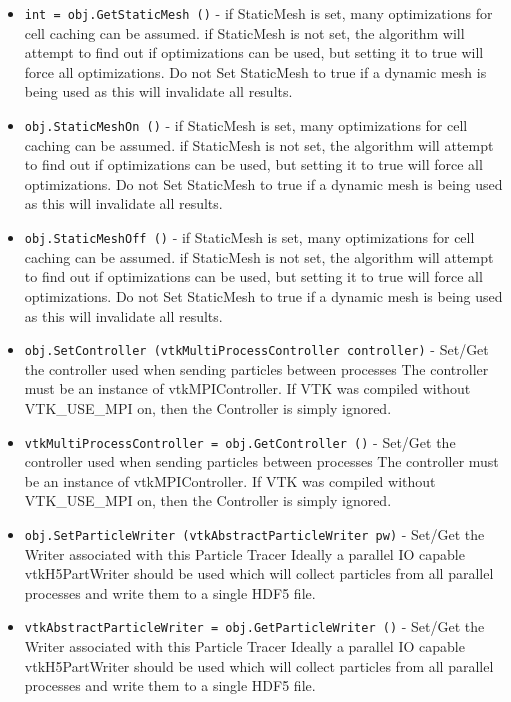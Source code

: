 \begin{itemize}
\item  \verb|int = obj.GetStaticMesh ()| -  if StaticMesh is set, many optimizations for cell caching
 can be assumed. if StaticMesh is not set, the algorithm
 will attempt to find out if optimizations can be used, but
 setting it to true will force all optimizations.
 Do not Set StaticMesh to true if a dynamic mesh is being used
 as this will invalidate all results.

\item  \verb|obj.StaticMeshOn ()| -  if StaticMesh is set, many optimizations for cell caching
 can be assumed. if StaticMesh is not set, the algorithm
 will attempt to find out if optimizations can be used, but
 setting it to true will force all optimizations.
 Do not Set StaticMesh to true if a dynamic mesh is being used
 as this will invalidate all results.

\item  \verb|obj.StaticMeshOff ()| -  if StaticMesh is set, many optimizations for cell caching
 can be assumed. if StaticMesh is not set, the algorithm
 will attempt to find out if optimizations can be used, but
 setting it to true will force all optimizations.
 Do not Set StaticMesh to true if a dynamic mesh is being used
 as this will invalidate all results.

\item  \verb|obj.SetController (vtkMultiProcessController controller)| -  Set/Get the controller used when sending particles between processes
 The controller must be an instance of vtkMPIController.
 If VTK was compiled without VTK\_USE\_MPI on, then the Controller is simply
 ignored.

\item  \verb|vtkMultiProcessController = obj.GetController ()| -  Set/Get the controller used when sending particles between processes
 The controller must be an instance of vtkMPIController.
 If VTK was compiled without VTK\_USE\_MPI on, then the Controller is simply
 ignored.

\item  \verb|obj.SetParticleWriter (vtkAbstractParticleWriter pw)| -  Set/Get the Writer associated with this Particle Tracer
 Ideally a parallel IO capable vtkH5PartWriter should be used
 which will collect particles from all parallel processes
 and write them to a single HDF5 file.

\item  \verb|vtkAbstractParticleWriter = obj.GetParticleWriter ()| -  Set/Get the Writer associated with this Particle Tracer
 Ideally a parallel IO capable vtkH5PartWriter should be used
 which will collect particles from all parallel processes
 and write them to a single HDF5 file.


\end{itemize}
